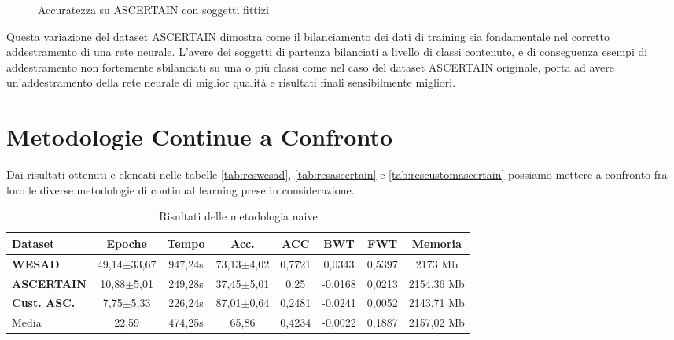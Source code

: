 \begin{figure}[!tbp]
\begin{minipage}[b]{0.5\textwidth}
		\caption{Accuratezza su ASCERTAIN con soggetti fittizi}
		\label{fig:customascertain_accuracy_graph}
	\end{minipage}
\end{figure}
Questa variazione del dataset ASCERTAIN dimostra come il bilanciamento dei dati di training sia fondamentale nel corretto addestramento di una rete neurale. L'avere dei soggetti di partenza bilanciati a livello di classi contenute, e di conseguenza esempi di addestramento non fortemente sbilanciati su una o più classi come nel caso del dataset ASCERTAIN originale, porta ad avere un'addestramento della rete neurale di miglior qualità e risultati finali sensibilmente migliori.
\section{Metodologie Continue a Confronto}
Dai risultati ottenuti e elencati nelle tabelle \ref{tab:reswesad}, \ref{tab:resascertain} e \ref{tab:rescustomascertain} possiamo mettere a confronto fra loro le diverse metodologie di continual learning prese in considerazione.

\begin{table}[h]
\footnotesize
    \begin{tabular}{l|c|c|c|c|c|c|c}
        \textbf{Dataset} & \textbf{Epoche} & \textbf{Tempo} & \textbf{Acc.} & \textbf{ACC} & \textbf{BWT} & \textbf{FWT} & \textbf{Memoria}\\
        \hline
        \textbf{WESAD} & 49,14$\pm$33,67 & 947,24s & 73,13$\pm$4,02 & 0,7721 & 0,0343 & 0,5397 & 2173 Mb\\
        \textbf{ASCERTAIN} & 10,88$\pm$5,01 & 249,28s & 37,45$\pm$5,01 & 0,25 & -0,0168 & 0,0213 & 2154,36 Mb\\
        \textbf{Cust. ASC.} & 7,75$\pm$5,33 & 226,24s & 87,01$\pm$0,64 & 0,2481 & -0,0241 & 0,0052 & 2143,71 Mb\\
        \hline
        Media & 22,59 & 474,25s & 65,86 & 0,4234 & -0,0022 & 0,1887 & 2157,02 Mb
    \end{tabular}
    \caption{Risultati delle metodologia naive}
    \label{tab:rescontinual}
\end{table}

